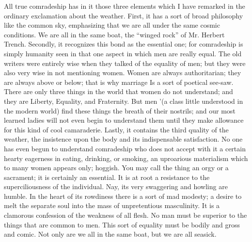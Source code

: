 \documentclass{book}
\begin{document}
All true comradeship has in it those three elements which I have remarked in the ordinary exclamation about the weather. First, it has a sort of broad philosophy like the common sky, emphasizing that we are all under the same cosmic conditions. We are all in the same boat, the “winged rock” of Mr. Herbert Trench. Secondly, it recognizes this bond as the essential one; for comradeship is simply humanity seen in that one aspect in which men are really equal. The old writers were entirely wise when they talked of the equality of men; but they were also very wise in not mentioning women. Women are always authoritarian; they are always above or below; that is why marriage Is a sort of poetical see-saw. There are only three things in the world that women do not understand; and they are Liberty, Equality, and Fraternity. But men ’(a class little understood in the modern world) find these things the breath of their nostrils; and our most learned ladies will not even begin to understand them until they make allowance for this kind of cool camaraderie. Lastly, it contains the third quality of the weather, the insistence upon the body and its indispensable satisfaction. No one has even begun to understand comradeship who does not accept with it a certain hearty eagerness in eating, drinking, or smoking, an uproarious materialism which to many women appears only; hoggish. You may call the thing an orgy or a sacrament; it is certainly an essential. It is at root a resistance to the superciliousness of the individual. Nay, its very swaggering and howling are humble. In the heart of its rowdiness there is a sort of mad modesty; a desire to melt the separate soul into the mass of unpretentious masculinity. It is a clamorous confession of the weakness of all flesh. No man must be superior to the things that are common to men. This sort of equality must be bodily and gross and comic. Not only are we all in the same boat, but we are all seasick.
\end{document}
